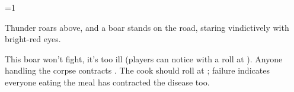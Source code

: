 
\ifnum\value{cycle}=1

  \begin{boxtext}
    Thunder roars above, and a boar stands on the road, staring vindictively with bright-red eyes.
  \end{boxtext}

  This boar won't fight, it's too ill (players can notice with a  roll at \tn[10]).
  Anyone handling the corpse contracts .%
  The cook should roll  at \tn[10]; failure indicates everyone eating the meal has contracted the disease too.

\fi

